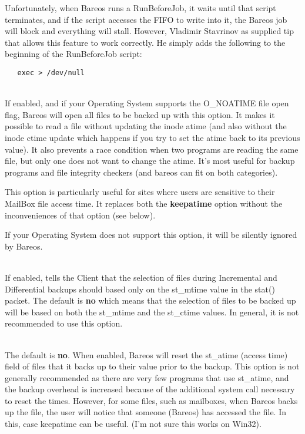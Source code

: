 \begin{description}
   Unfortunately, when Bareos runs a RunBeforeJob, it waits until that
   script terminates, and if the script accesses the FIFO to write
   into it, the Bareos job will block and everything will stall.
   However, Vladimir Stavrinov as supplied tip that allows this feature
   to work correctly.  He simply adds the following to the beginning
   of the RunBeforeJob script:

\begin{verbatim}
   exec > /dev/null
\end{verbatim}

\item [noatime=yes{\textbar}no] \hfill \\
   If enabled, and if your Operating System supports the O\_NOATIME file
   open flag, Bareos will open all files to be backed up with this option.
   It makes it possible to read a file without updating the inode atime
   (and also without the inode ctime update which happens if you try to set
   the atime back to its previous value).  It also prevents a race
   condition when two programs are reading the same file, but only one does
   not want to change the atime.  It's most useful for backup programs and
   file integrity checkers (and bareos can fit on both categories).

   This option is particularly useful for sites where users are sensitive
   to their MailBox file access time.  It replaces both the {\bf keepatime}
   option without the inconveniences of that option (see below).

   If your Operating System does not support this option, it will be
   silently ignored by Bareos.


\item [mtimeonly=yes{\textbar}no] \hfill \\
   If enabled, tells the Client that the selection of files during
   Incremental and Differential backups should based only on the st\_mtime
   value in the stat() packet.  The default is {\bf no} which means that
   the selection of files to be backed up will be based on both the
   st\_mtime and the st\_ctime values.  In general, it is not recommended
   to use this option.

\item [keepatime=yes{\textbar}no] \hfill \\
   The default is {\bf no}.  When enabled, Bareos will reset the st\_atime
   (access time) field of files that it backs up to their value prior to
   the backup.  This option is not generally recommended as there are very
   few programs that use st\_atime, and the backup overhead is increased
   because of the additional system call necessary to reset the times.
   However, for some files, such as mailboxes, when Bareos backs up the
   file, the user will notice that someone (Bareos) has accessed the
   file. In this, case keepatime can be useful.
   (I'm not sure this works on Win32).


\end{description}
